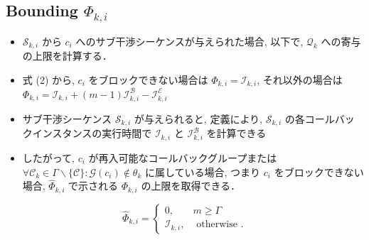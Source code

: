 \subsection{Bounding $\Phi_{k, i}$}
\label{ssec: bounding_phi}

\begin{frame}{}
    \begin{itemize}
        \item $\mathcal{S}_{k, i}$ から $c_{i}$ へのサブ干渉シーケンスが与えられた場合, 以下で, $\mathcal{Q}_{k}$ への寄与の上限を計算する．
    \end{itemize}
\end{frame}

\begin{frame}{}
    \begin{itemize}
        \item 式 (2) から, $c_{i}$ をブロックできない場合は $\Phi_{k, i}=\mathcal{I}_{k, i}$, それ以外の場合は $\Phi_{k, i}=\mathcal{I}_{k, i}+(m-1) \mathcal{I}_{k, i}^{\mathcal{B}}-\mathcal{I}_{k, i}^{\mathcal{E}}$
        \item サブ干渉シーケンス $\mathcal{S}_{k, i}$ が与えられると, 定義により, $\mathcal{S}_{k, i}$ の各コールバックインスタンスの実行時間で $\mathcal{I}_{k, i}$ と $\mathcal{I}_{k, i}^{\mathcal{B}}$ を計算できる
        \item したがって, $c_{i}$ が再入可能なコールバックグループまたは $\forall \mathcal{C}_{k} \in \Gamma \backslash\{\mathcal{C}\}: \mathcal{G}\left(c_{i}\right) \notin \theta_{k}$ に属している場合, つまり $c_{i}$ をブロックできない場合,  $\hat{\Phi}_{k, i}$ で示される $\Phi_{k, i}$ の上限を取得できる．
    \end{itemize}

    \begin{equation*}
        \hat{\Phi}_{k, i}=\left\{\begin{array}{lr}
            0,                  & m \geq \Gamma         \\
            \mathcal{I}_{k, i}, & \text { otherwise } .
        \end{array}\right.
    \end{equation*}
\end{frame}

